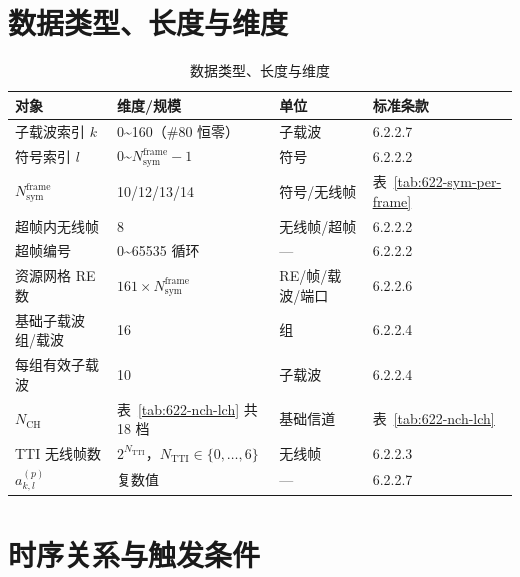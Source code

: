 \documentclass[11pt,a4paper]{ctexart}
\begin{document}
\section{数据类型、长度与维度}

\begin{longtable}{llll}
\caption{数据类型、长度与维度} \\
\toprule
\textbf{对象} & \textbf{维度/规模} & \textbf{单位} & \textbf{标准条款} \\
\midrule
子载波索引 $k$ & 0\textasciitilde 160（\#80 恒零） & 子载波 & 6.2.2.7 \\
符号索引 $l$ & 0\textasciitilde $N_{\mathrm{sym}}^{\mathrm{frame}}{-}1$ & 符号 & 6.2.2.2 \\
$N_{\mathrm{sym}}^{\mathrm{frame}}$ & 10/12/13/14 & 符号/无线帧 & 表~\ref{tab:622-sym-per-frame} \\
超帧内无线帧 & 8 & 无线帧/超帧 & 6.2.2.2 \\
超帧编号 & 0\textasciitilde 65535 循环 & --- & 6.2.2.2 \\
资源网格 RE 数 & $161 \times N_{\mathrm{sym}}^{\mathrm{frame}}$ & RE/帧/载波/端口 & 6.2.2.6 \\
基础子载波组/载波 & 16 & 组 & 6.2.2.4 \\
每组有效子载波 & 10 & 子载波 & 6.2.2.4 \\
$N_{\mathrm{CH}}$ & 表~\ref{tab:622-nch-lch} 共 18 档 & 基础信道 & 表~\ref{tab:622-nch-lch} \\
TTI 无线帧数 & $2^{N_{\mathrm{TTI}}}$，$N_{\mathrm{TTI}}\in\{0,\ldots,6\}$ & 无线帧 & 6.2.2.3 \\
$a_{k,l}^{(p)}$ & 复数值 & --- & 6.2.2.7 \\
\bottomrule
\end{longtable}

\section{时序关系与触发条件}
\end{document}

